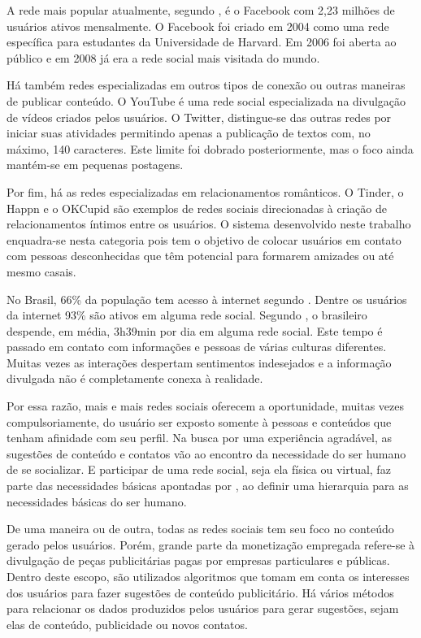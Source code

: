 A rede mais popular atualmente, segundo \cite{lua19}, é o Facebook com 2,23 milhões de usuários ativos mensalmente. O Facebook foi criado em 2004 como uma rede específica para estudantes da Universidade de Harvard. Em 2006 foi aberta ao público e em 2008 já era a rede social mais visitada do mundo.

Há também redes especializadas em outros tipos de conexão ou outras maneiras de publicar conteúdo. O YouTube é uma rede social especializada na divulgação de vídeos criados pelos usuários. O Twitter, distingue-se das outras redes por iniciar suas atividades permitindo apenas a publicação de textos com, no máximo, 140 caracteres. Este limite foi dobrado posteriormente, mas o foco ainda mantém-se em pequenas postagens.

Por fim, há as redes especializadas em relacionamentos românticos. O Tinder, o Happn e o OKCupid são exemplos de redes sociais direcionadas à criação de relacionamentos íntimos entre os usuários. O sistema desenvolvido neste trabalho enquadra-se nesta categoria pois tem o objetivo de colocar usuários em contato com pessoas desconhecidas que têm potencial para formarem amizades ou até mesmo casais.

No Brasil, 66\% da população tem acesso à internet segundo \cite{wearesocial18}. Dentre os usuários da internet 93\% são ativos em alguma rede social.
Segundo \cite{wearesocial18}, o brasileiro despende, em média, 3h39min por dia em alguma rede social. Este tempo é passado em contato com informações e pessoas de várias culturas diferentes. Muitas vezes as interações despertam sentimentos indesejados e a informação divulgada não é completamente conexa à realidade.

Por essa razão, mais e mais redes sociais oferecem a oportunidade, muitas vezes compulsoriamente, do usuário ser exposto somente à pessoas e conteúdos que tenham afinidade com seu perfil. Na busca por uma experiência agradável, as sugestões de conteúdo e contatos vão ao encontro da necessidade do ser humano de se socializar. E participar de uma rede social, seja ela física ou virtual, faz parte das necessidades básicas apontadas por \cite{Maslow1943}, ao definir uma hierarquia para as necessidades básicas do ser humano.

De uma maneira ou de outra, todas as redes sociais tem seu foco no conteúdo gerado pelos usuários. Porém, grande parte da monetização empregada refere-se à divulgação de peças publicitárias pagas por empresas particulares e públicas. Dentro deste escopo, são utilizados algoritmos que tomam em conta os interesses dos usuários para fazer sugestões de conteúdo publicitário. Há vários métodos para relacionar os dados produzidos pelos usuários para gerar sugestões, sejam elas de conteúdo, publicidade ou novos contatos.

